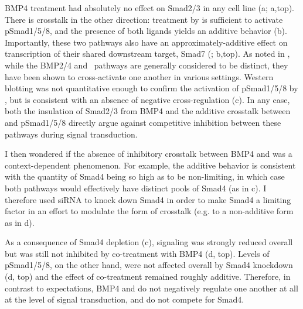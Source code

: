  
  
BMP4 treatment
had absolutely no effect on Smad2/3 in any cell line
(a;
 a,top). There is crosstalk
in the other direction:
treatment by  is sufficient to activate pSmad1/5/8, and
the presence of both ligands yields an additive behavior
(b). Importantly, these
two pathways also have an approximately-additive effect on
transcription of their shared downstream target, Smad7
(; b,top).
As noted
in , while the BMP2/4 and \tgf\ pathways
are generally considered to be distinct, they have been shown to
cross-activate one another in various settings.
Western blotting was not quantitative enough to confirm the
activation of pSmad1/5/8 by , but is consistent with an
absence of negative cross-regulation
(c). In any case,
both the insulation of Smad2/3 from BMP4 and the additive
crosstalk between  and pSmad1/5/8 directly argue against
competitive inhibition between these pathways
during signal transduction.


I then wondered if the absence of inhibitory crosstalk
between BMP4 and  was a context-dependent phenomenon.
For example, the additive behavior is consistent
with the quantity of Smad4 being so high
as to be non-limiting, in which case both pathways would effectively have
distinct pools of Smad4 (as in c).
I therefore used siRNA to knock down Smad4 in order to make Smad4 a
limiting factor in an effort to modulate the form of crosstalk
(e.g. to a non-additive form as in d).


As a consequence of Smad4 depletion
(c),  signaling was strongly reduced overall
but was still not inhibited by co-treatment with BMP4
(d, top). Levels of pSmad1/5/8,
on the other hand, were not affected overall by Smad4 knockdown
(d, top) and the effect of co-treatment
remained roughly additive. Therefore, in contrast to expectations,
BMP4 and  do not negatively regulate one another at all
at the level of signal transduction, and do
not compete for Smad4.

